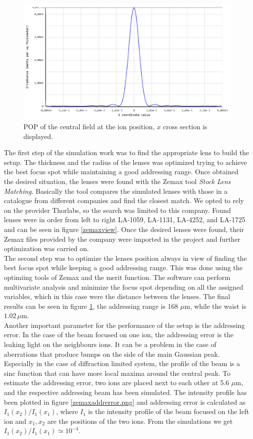 \begin{figure}
    \centering
    \includegraphics[width=.8\textwidth]{img/pop2}
\caption{POP of the central field at the ion position, $x$ cross section is displayed.}
\label{zemaxfocus}
\end{figure}
The first step of the simulation work was to find the appropriate lens to build the setup. The thickness and the radius of the lenses was optimized trying to achieve the best focus spot while maintaining a good addressing range. Once obtained the desired situation, the lenses were found with the Zemax tool \emph{Stock Lens Matching}. Basically the tool compares the simulated lenses with those in a catalogue from different companies and find the closest match. We opted to rely on the provider Thorlabs, so the search was limited to this company. Found lenses were in order from left to right LA-1059, LA-1131, LA-4252, and LA-1725 and can be seen in figure \ref{zemaxview}. Once the desired lenses were found, their Zemax files provided by the company were imported in the project and further optimization was carried on.\\
The second step was to optimize the lenses position always in view of finding the best focus spot while keeping a good addressing range. This was done using the optimiing tools of Zemax and the merit function. The software can perform multivariate analysis and minimize the focus spot depending on all the assigned variables, which in this case were the distance between the lenses. The final results can be seen in figure \ref{zemaxfocus}, the addressing range is 168 $\mu$m, while the waist is $1.02\,\mu$m.\\
 Another important parameter for the performance of the setup is the addressing error. In the case of the beam focused on one ion, the addressing error is the leaking light on the neighbours ions. It can be a problem in the case of aberrations that produce bumps on the side of the main Gaussian peak. Especially in the case of diffraction limited system, the profile of the beam is a sinc function that can have more local maxima around the central peak. To estimate the addressing error, two ions are placed next to each other at 5.6 $\mu$m, and the respective addressing beam has been simulated. The intensity profile has been plotted in figure \ref{zemaxaddrerror.png} and addressing error is calculated as $I_1(x_2)/I_1(x_1)$, where $I_1$ is the intensity profile of the beam focused on the left ion and $x_1,x_2$ are the positions of the two ions. From the simulations we get $I_1(x_2)/I_1(x_1) \simeq 10^{-4}$.\\

